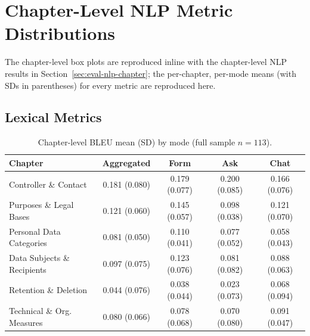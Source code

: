 \section{Chapter-Level NLP Metric Distributions}
\label{app:items-chapter-nlp}

The chapter-level box plots are reproduced inline with the
chapter-level NLP results in Section~\ref{sec:eval-nlp-chapter};
the per-chapter, per-mode means (with SDs in parentheses) for
every metric are reproduced here.

\subsection{Lexical Metrics}
\label{app:items-chapter-nlp-lexical}

\begin{table}[htbp]
\centering
\caption{Chapter-level BLEU mean (SD) by mode (full sample
$n = 113$).}
\label{tab:nlp-chapter-bleu}
\small
\begin{tabular}{@{}l c c c c@{}}
\toprule
Chapter & Aggregated & Form & Ask & Chat \\
\midrule
Controller \& Contact         & 0.181 (0.080) & 0.179 (0.077) & 0.200 (0.085) & 0.166 (0.076) \\
Purposes \& Legal Bases       & 0.121 (0.060) & 0.145 (0.057) & 0.098 (0.038) & 0.121 (0.070) \\
Personal Data Categories      & 0.081 (0.050) & 0.110 (0.041) & 0.077 (0.052) & 0.058 (0.043) \\
Data Subjects \& Recipients   & 0.097 (0.075) & 0.123 (0.076) & 0.081 (0.082) & 0.088 (0.063) \\
Retention \& Deletion         & 0.044 (0.076) & 0.038 (0.044) & 0.023 (0.073) & 0.068 (0.094) \\
Technical \& Org. Measures    & 0.080 (0.066) & 0.078 (0.068) & 0.070 (0.080) & 0.091 (0.047) \\
\bottomrule
\end{tabular}
\end{table}

